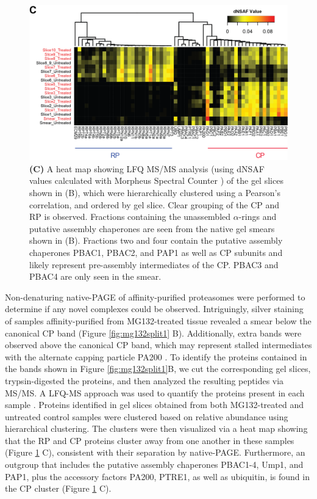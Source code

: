 \begin{figure}
	\ContinuedFloat
	\centering
	\includegraphics[width=\columnwidth]{Proteasome/mg132split2.png}
	{\textbf{(C)} A heat map showing LFQ MS/MS analysis (using dNSAF values calculated with Morpheus Spectral Counter \citep{gemperline16}) of the gel slices shown in (B), which were hierarchically clustered using a Pearson’s correlation, and ordered by gel slice. Clear grouping of the CP and RP is observed. Fractions containing the unassembled $\alpha$-rings and putative assembly chaperones are seen from the native gel smears shown in (B). Fractions two and four contain the putative assembly chaperones PBAC1, PBAC2, and PAP1 as well as CP subunits and likely represent pre-assembly intermediates of the CP. PBAC3 and PBAC4 are only seen in the smear.}
	\label{fig:mg132split2}
\end{figure}

Non-denaturing native-PAGE of affinity-purified proteasomes were performed to determine if any novel complexes could be observed. Intriguingly, silver staining of samples affinity-purified from MG132-treated tissue revealed a smear below the canonical CP band (Figure \ref{fig:mg132split1} B). Additionally, extra bands were observed above the canonical CP band, which may represent stalled intermediates with the alternate capping particle PA200 \citep{li07}. To identify the proteins contained in the bands shown in Figure \ref{fig:mg132split1}B, we cut the corresponding gel slices, trypsin-digested the proteins, and then analyzed the resulting peptides via MS/MS. A LFQ-MS approach was used to quantify the proteins present in each sample \citep{gemperline16}. Proteins identified in gel slices obtained from both MG132-treated and untreated control samples were clustered based on relative abundance using hierarchical clustering. The clusters were then visualized via a heat map showing that the RP and CP proteins cluster away from one another in these samples (Figure \ref{fig:mg132split2} C), consistent with their separation by native-PAGE. Furthermore, an outgroup that includes the putative assembly chaperones PBAC1-4, Ump1, and PAP1, plus the accessory factors PA200, PTRE1, as well as ubiquitin, is found in the CP cluster (Figure \ref{fig:mg132split2} C).


